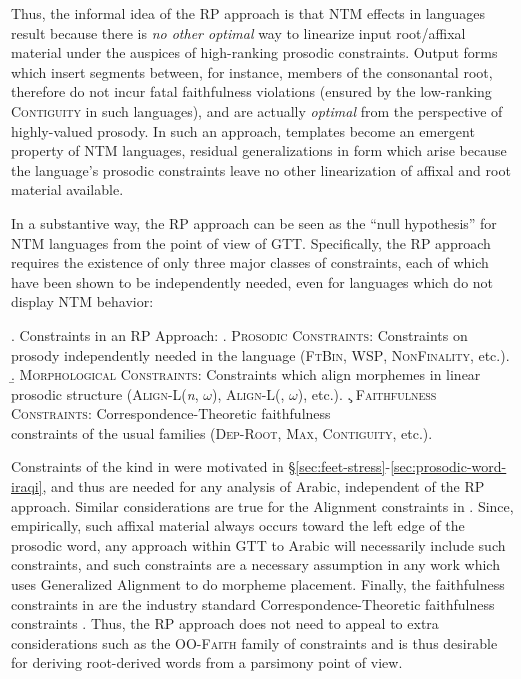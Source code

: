 \documentclass[12pt,twoside,letterpaper]{article}
\begin{document}
Thus, the informal idea of the RP approach is that NTM effects in languages result because there is \emph{no other optimal} way to linearize input root/affixal material under the auspices of high-ranking prosodic constraints. Output forms which insert segments between, for instance, members of the consonantal root, therefore do not incur fatal faithfulness violations (ensured by the low-ranking \textsc{Contiguity} in such languages), and are actually \emph{optimal} from the perspective of highly-valued prosody. In such an approach, templates become an emergent property of NTM languages, residual generalizations in form which arise because the language's prosodic constraints leave no other linearization of affixal and root material available.

In a substantive way, the RP approach can be seen as the ``null hypothesis'' for NTM languages from the point of view of GTT. Specifically, the RP approach requires the existence of only three major classes of constraints, each of which have been shown to be independently needed, even for languages which do not display NTM behavior:

\ex. Constraints in an RP Approach:
\a. \textsc{Prosodic Constraints}: Constraints on prosody independently needed in the language (\textsc{FtBin}, \textsc{WSP}, \textsc{NonFinality}, etc.).
\b. \textsc{Morphological Constraints}: Constraints which align morphemes in linear prosodic structure (\textsc{Align-L}(\emph{n}, $\omega$), \textsc{Align-L}(, $\omega$), etc.).
\c. \textsc{Faithfulness Constraints}: Correspondence-Theoretic faithfulness\\constraints of the usual families (\textsc{Dep-Root}, \textsc{Max}, \textsc{Contiguity}, etc.).

Constraints of the kind in \Last[a] were motivated in \S{\ref{sec:feet-stress}-\ref{sec:prosodic-word-iraqi}}, and thus are needed for any analysis of Arabic, independent of the RP approach. Similar considerations are true for the Alignment constraints in \Last[b]. Since, empirically, such affixal material always occurs toward the left edge of the prosodic word, any approach within GTT to Arabic will necessarily include such constraints, and such constraints are a necessary assumption in any work which uses Generalized Alignment \citep{mccarthy93} to do morpheme placement. Finally, the faithfulness constraints in \Last[c] are the industry standard Correspondence-Theoretic faithfulness constraints \citep{mccarthy95}. Thus, the RP approach does not need to appeal to extra considerations such as the \textsc{OO-Faith} family of constraints \citep{benua00} and is thus desirable for deriving root-derived words from a parsimony point of view.
\end{document}
